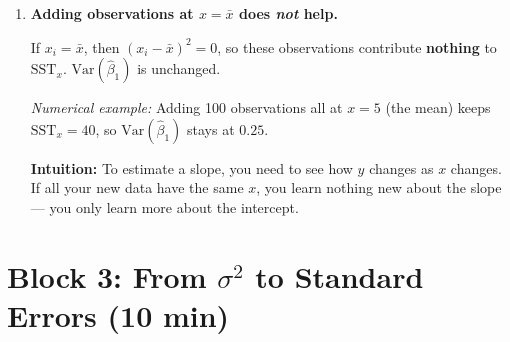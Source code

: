 \documentclass[11pt,a4paper]{article}
\begin{document}
\begin{enumerate}[label=(\alph*)]
\begin{solution}
\begin{enumerate}[label=(\roman*)]
  \item \textbf{Adding observations at $x = \bar{x}$ does \emph{not} help.}

  If $x_i = \bar{x}$, then $(x_i - \bar{x})^2 = 0$, so these observations contribute \textbf{nothing} to $\text{SST}_x$. $\text{Var}(\hat{\beta}_1)$ is unchanged.

  \emph{Numerical example:} Adding 100 observations all at $x = 5$ (the mean) keeps $\text{SST}_x = 40$, so $\text{Var}(\hat{\beta}_1)$ stays at $0.25$.

  \textbf{Intuition:} To estimate a slope, you need to see how $y$ changes as $x$ changes. If all your new data have the same $x$, you learn nothing new about the slope --- you only learn more about the intercept.
\end{enumerate}
\end{solution}

\end{enumerate}

\section{Block 3: From $\sigma^2$ to Standard Errors \textnormal{(10 min)}}
\end{document}
